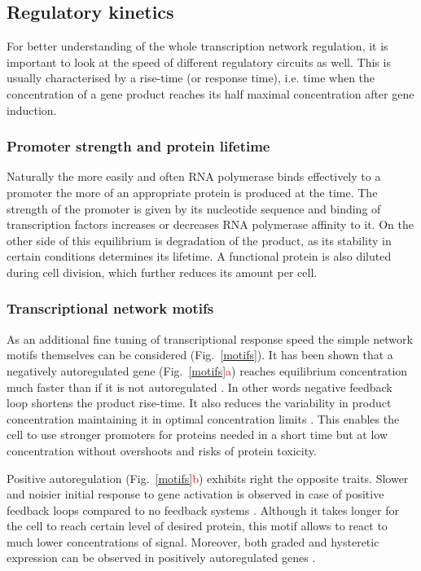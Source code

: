 \subsection{Regulatory kinetics}
For better understanding of the whole transcription network regulation, it is important to look at the speed of different regulatory circuits as well.
This is usually characterised by a rise-time (or response time), i.e. time when the concentration of a gene product reaches its half maximal concentration after gene induction.

\subsubsection{Promoter strength and protein lifetime}
Naturally the more easily and often RNA polymerase binds effectively to a promoter the more of an appropriate protein is produced at the time.
The strength of the promoter is given by its nucleotide sequence and binding of transcription factors increases or decreases RNA polymerase affinity to it.
On the other side of this equilibrium is degradation of the product, as its stability in certain conditions determines its lifetime.
A functional protein is also diluted during cell division, which further reduces its amount per cell.

\subsubsection{Transcriptional network motifs}
As an additional fine tuning of transcriptional response speed the simple network motifs themselves can be considered (Fig.~\ref{motifs}).
It has been shown that a negatively autoregulated gene (Fig.~\ref{motifs}\textcolor{red}{a}) reaches equilibrium concentration much faster than if it is not autoregulated \cite{rosenfeld2002negative}.
In other words negative feedback loop shortens the product rise-time.
It also reduces the variability in product concentration maintaining it in optimal concentration limits \cite{becskei2000engineering}.
This enables the cell to use stronger promoters for proteins needed in a short time but at low concentration without overshoots and risks of protein toxicity.

Positive autoregulation (Fig.~\ref{motifs}\textcolor{red}{b}) exhibits right the opposite traits.
Slower and noisier initial response to gene activation is observed in case of positive feedback loops compared to no feedback systems \cite{maeda2006regulatory, sayut2007noise}.
Although it takes longer for the cell to reach certain level of desired protein, this motif allows to react to much lower concentrations of signal.
Moreover, both graded and hysteretic expression can be observed in positively autoregulated genes \cite{maeda2006regulatory}.

